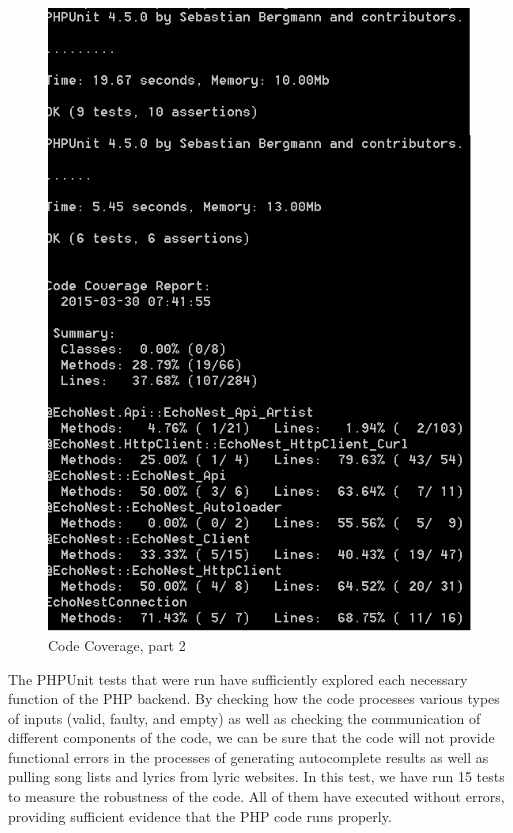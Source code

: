 \documentclass[]{article}
\begin{document}
\begin{figure}[htbp]
\centering
\includegraphics{codeCoverage2.png}
\caption{Code Coverage, part 2}
\end{figure}

The PHPUnit tests that were run have sufficiently explored each
necessary function of the PHP backend. By checking how the code
processes various types of inputs (valid, faulty, and empty) as well as
checking the communication of different components of the code, we can
be sure that the code will not provide functional errors in the
processes of generating autocomplete results as well as pulling song
lists and lyrics from lyric websites. In this test, we have run 15 tests
to measure the robustness of the code. All of them have executed without
errors, providing sufficient evidence that the PHP code runs properly.
\end{document}
